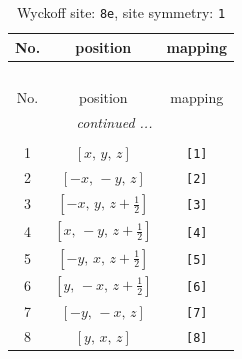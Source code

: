 \documentclass[fleqn,8pt]{jsarticle}
\begin{document}
\renewcommand{\arraystretch}{1.2}
\begin{longtable}{ccc}
\caption{Wyckoff site: {\tt 8e}, site symmetry: {\tt 1}}
 \\
 \hline \hline
No. & position & mapping \\ \hline \endfirsthead

\multicolumn{2}{l}{\tablename\ \thetable{}} \\
 \hline \hline
No. & position & mapping \\ \hline \endhead

 \hline \hline
\multicolumn{2}{r}{\footnotesize\it continued ...} \\ \endfoot

 \hline \hline
\multicolumn{2}{r}{} \\ \endlastfoot

1 & $\left[ x,\, y,\, z \right]$ & {\tt [1]} \\ \hline
2 & $\left[ - x,\, - y,\, z \right]$ & {\tt [2]} \\ \hline
3 & $\left[ - x,\, y,\, z + \frac{1}{2} \right]$ & {\tt [3]} \\ \hline
4 & $\left[ x,\, - y,\, z + \frac{1}{2} \right]$ & {\tt [4]} \\ \hline
5 & $\left[ - y,\, x,\, z + \frac{1}{2} \right]$ & {\tt [5]} \\ \hline
6 & $\left[ y,\, - x,\, z + \frac{1}{2} \right]$ & {\tt [6]} \\ \hline
7 & $\left[ - y,\, - x,\, z \right]$ & {\tt [7]} \\ \hline
8 & $\left[ y,\, x,\, z \right]$ & {\tt [8]} \\
\end{longtable}
\end{document}
